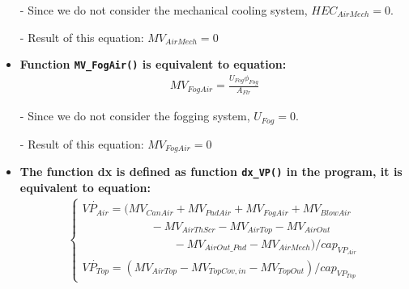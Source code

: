 \documentclass[a4paper]{article}
\numberwithin{equation}{section}
\begin{document}
\begin{itemize}
  \item[-] Since we do not consider the mechanical cooling system, \( HEC_{AirMech} = 0 \).
  \item[-] Result of this equation: \( MV_{AirMech} = 0 \)

  \item \textbf{Function \texttt{MV\_FogAir()} is equivalent to equation:}
        \begin{align*}
          MV_{FogAir} = \frac{U_{Fog} \phi_{Fog}}{A_{Flr}}
        \end{align*}

  \item[-] Since we do not consider the fogging system, \( U_{Fog} = 0 \).
  \item[-] Result of this equation: \( MV_{FogAir} = 0 \)

  \item \textbf{The function \textbf{dx} is defined as function \texttt{dx\_VP()} in the program, it is equivalent to equation:}
        \begin{align*}
          \begin{cases}
            \dot{VP_{Air}} = (MV_{CanAir} + MV_{PadAir} + MV_{FogAir} + MV_{BlowAir} \\ \qquad \qquad \qquad
            - MV_{AirThScr} - MV_{AirTop} - MV_{AirOut}                              \\ \qquad \qquad \qquad \qquad
            - MV_{AirOut\_Pad} - MV_{AirMech}) / cap_{VP_{Air}}                      \\
            \dot{VP_{Top}} = (MV_{AirTop} - MV_{TopCov,in} - MV_{TopOut}) / cap_{VP_{Top}}
          \end{cases}
        \end{align*}


\end{itemize}
\end{document}
